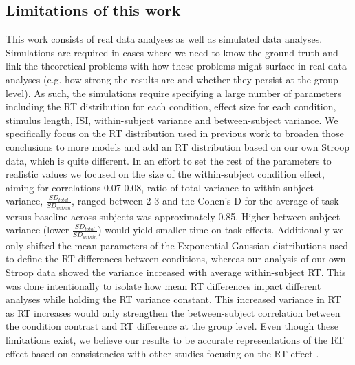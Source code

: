 \documentclass[titlepage,12pt] {article}
\begin{document}
\subsection*{Limitations of this work}
This work consists of real data analyses as well as simulated data analyses.  Simulations are required in cases where we need to know the ground truth and link the theoretical problems with how these problems might surface in real data analyses (e.g. how strong the results are and whether they persist at the group level). As such, the simulations require specifying a large number of parameters including the RT distribution for each condition, effect size for each condition, stimulus length, ISI,  within-subject variance and between-subject variance.  We specifically focus on the RT distribution used in previous work \citep{grinband_detection_2008} to broaden those conclusions to more models and add an RT distribution based on our own Stroop data, which is quite different.   In an effort to set the rest of the parameters to realistic values we focused on the size of the within-subject condition effect, aiming for correlations 0.07-0.08, ratio of total variance to within-subject variance, $\frac{SD_{total}}{SD_{within}}$,  ranged between 2-3 and the Cohen's D for the average of task versus baseline across subjects was approximately 0.85.  Higher between-subject variance (lower $\frac{SD_{total}}{SD_{within}}$) would yield smaller time on task effects.  Additionally we only shifted the mean parameters of the Exponential Gaussian distributions used to define the RT differences between conditions, whereas our analysis of our own Stroop data showed the variance increased with average within-subject RT.  This was done intentionally to isolate how mean RT differences impact different analyses while holding the RT variance constant.  This increased variance in RT as RT increases would only strengthen the between-subject correlation between the condition contrast and RT difference at the group level.   Even though these limitations exist, we believe our results to be accurate representations of the RT effect based on consistencies with other studies focusing on the RT effect \citep{yarkoni_bold_2009, brown_medial_2011, grinband_dorsal_2011}.  


\end{document}
